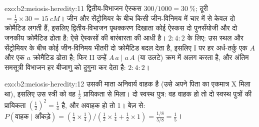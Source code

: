 \begin{solution}{exo:b2:meiosis-heredity:11}
द्वितीय-विभाजन ऐस्कस $300/1000 = \qty{30}{\%}$; दूरी $=
\tfrac12\times 30 = \qty{15}{cM}$। जीन और सेंट्रोमियर के बीच किसी
जीन-विनिमय में चार में से केवल दो क्रोमैटिड लगती हैं, इसलिए
द्वितीय-विभाजन पृथक्करण दिखाता कोई ऐस्कस दो पुनर्संयोजी और दो जनकीय
क्रोमैटिड ढोता है:  ऐसे ऐस्कसों की
बारंबारता की आधी है। $2 : 4 : 2$ के लिए: उस स्थल और सेंट्रोमियर के बीच
कोई जीन-विनिमय भीतरी दो क्रोमैटिड बदल देता है, इसलिए
 I पर हर अर्ध-तर्कु एक $A$ और एक $a$
क्रोमैटिड ढोता है; फिर  II उन्हें $A\,a \mid
a\,A$ (या उलटे) क्रम में अलग करता है, और अंतिम समसूत्री विभाजन हर बीजाणु
को दुगुना कर देता है: $2 : 4 : 2$।
\end{solution}

\begin{solution}{exo:b2:meiosis-heredity:12}
उसकी माता अनिवार्य वाहक है (उसे अपने पिता का एकमात्र X मिला था),
इसलिए उस स्त्री को वह  $\tfrac12$ प्रायिकता से मिला।
दो स्वस्थ पुत्र: वह वाहक हो तो दो स्वस्थ पुत्रों की प्रायिकता
$(\tfrac12)^2 = \tfrac14$ है, और अवाहक हो तो 1। बेज़ से:
$P(\text{वाहक}\mid\text{आँकड़े}) = (\tfrac12\times\tfrac14)/(\tfrac12
\times\tfrac14 + \tfrac12\times 1) = \tfrac{1/8}{5/8} = \tfrac15$।
\end{solution}

